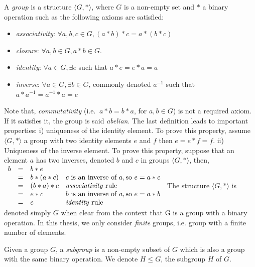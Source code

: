 \begin{definition}[Group]
 A \emph{group} is a structure $\langle G, * \rangle$, where $G$ is a non-empty set and $*$ a binary
 operation such as the following axioms are satisfied:
 \begin{itemize}[noitemsep,nolistsep]
  \item \emph{associativity}: $\forall a, b, c \in G, (a * b) * c = a * (b * c)$
  \item \emph{closure}: $\forall a, b \in G, a * b \in G$.
  \item \emph{identity}: $\forall a \in G, \exists e$ such that $ a * e = e * a = a$
  \item \emph{inverse}:  $\forall a \in G, \exists b \in G$, commonly denoted $a^{-1}$ such that
  $a * a^{-1} = a^{-1} * a = e$
 \end{itemize}
\end{definition}
Note that, \emph{commutativity} (i.e. $\ a * b = b * a$, for $a, b \in G$) is not a required axiom.
If it satisfies it, the group is said \emph{abelian}.
The last definition leads to important properties: i) uniqueness of the identity element. 
To prove this property, assume $\langle G, * \rangle$ a group with two identity elements $e$ and $f$ 
then $ e = e * f = f$.
ii) Uniqueness of the inverse element. To prove this property, suppose that an element $a$ has two inverses,
denoted $b$ and $c$ in groups $\langle G, * \rangle$, then,\\
 $\begin{array}{lcll}     
b & = & b * e & \\
& = & b * (a * c) & c \text{ is an inverse of } a, \text{so } e = a * c\\
& = & (b * a) * c &   \text{\emph{associativity} rule}\\
& = & e * c       & b \text{ is an inverse of } a, \text{so } e = a * b\\
& = & c           &   \text{\emph{identity} rule}
\end{array}$
The structure $\langle G, * \rangle$ is denoted simply $G$ when clear from the context that G is a group
with a binary operation. In this thesis, we only consider \emph{finite} groups, i.e. group with a finite number of elements.
\begin{definition}[Subgroup]
Given a group $G$, a \emph{subgroup} is a non-empty subset of $G$ which is also a group with 
the same binary operation. We denote $H \leq G$, the subgroup $H$ of $G$.
\end{definition}
